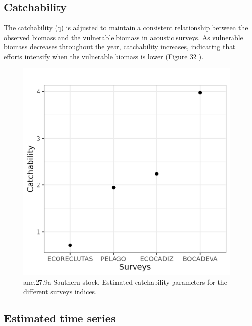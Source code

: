 \documentclass[
]{article}
\begin{document}
\hypertarget{catchability-1}{%
\subsection{Catchability}\label{catchability-1}}

The catchability (q) is adjusted to maintain a consistent relationship
between the observed biomass and the vulnerable biomass in acoustic
surveys. As vulnerable biomass decreases throughout the year,
catchability increases, indicating that efforts intensify when the
vulnerable biomass is lower (Figure 32 ).

\begin{figure}[H]

{\centering \includegraphics[width=0.95\linewidth]{report/run/S1.0_4FLEETS_SelECO_RecIndex_Mnewfix/fig_catchability} 

}

\caption{ane.27.9a Southern stock. Estimated catchability parameters for the different surveys indices.}\label{fig:unnamed-chunk-64}
\end{figure}

\hypertarget{estimated-time-series}{%
\subsection{Estimated time series}\label{estimated-time-series}}
\end{document}
